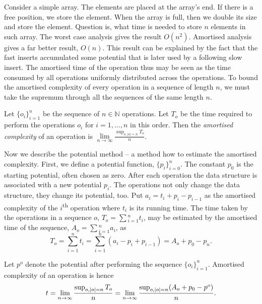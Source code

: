 Consider a simple array. The elements are placed at the array's end. If there is a free position, we store the element. When the array is full, then we double its size and store the element. Question is, what time is needed to store $n$ elements in such array. The worst case analysis gives the result $O(n ^ 2)$. Amortised analysis gives a far better result, $O(n)$. This result can be explained by the fact that the fast inserts accumulated some potential that is later used by a following slow insert. The amortised time of the operation thus may be seen as the time consumed by all operations uniformly distributed across the operations. To bound the amortised complexity of every operation in a sequence of length $n$, we must take the supremum through all the sequences of the same length $n$.
\begin{definition}
Let $\{o_i\}_{i = 1}^{n}$ be the sequence of $n \in \mathbb{N}$ operations. Let $T_o$ be the time required to perform the operations $o_i$ for $i = 1, \dots, n$ in this order. Then the \emph{amortised complexity} of an operation is $\lim\limits_{n \rightarrow \infty}\frac{\sup_{o, |o| = n}T_o}{n}$.
\end{definition}

Now we describe the potential method -- a method how to estimate the amortised complexity. First, we define a potential function, $\{p_i\}_{i = 0}^{n}$. The constant $p_0$ is the starting potential, often chosen as zero. After each operation the data structure is associated with a new potential $p_i$. The operations not only change the data structure, they change its potential, too. Put $a_i = t_i + p_{i} - p_{i - 1}$ as the amortised complexity of the $i$\textsuperscript{th} operation where $t_i$ is its running time. The time taken by the operations in a sequence $o$, $T_o = \sum\displaystyle_{i = 1}^{n} t_i$, may be estimated by the amortised time of the sequence, $A_o = \sum\displaystyle_{i = 1}^{n} a_i$, as
\[
	T_o = \displaystyle\sum_{i = 1}^{n} t_i = \displaystyle\sum_{i = 1}^{n} (a_i - p_i + p_{i - 1}) = A_o + p_0 - p_n \text{.}
\]

Let $p^o$ denote the potential after performing the sequence $\{o_i\}_{i = 1}^{n}$. Amortised complexity of an operation is hence
\[
	t = \lim\limits_{n \rightarrow \infty} \frac{\sup\displaylimits_{o, |o| = n} T_o}{n} = \lim\limits_{n \rightarrow \infty} \frac{\sup\displaylimits_{o, |o| = n} (A_o + p_0 - p^o)}{n} \text{.}
\]

